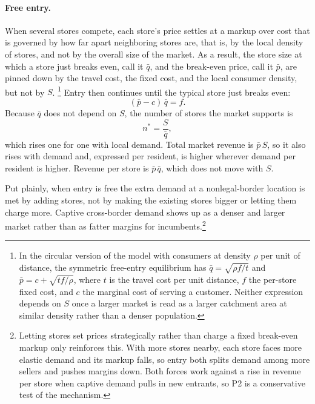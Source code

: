 \documentclass[english,12pt]{article}
\begin{document}
\paragraph{Free entry.} When several stores compete, each store's price settles at a markup over cost that is governed by how far apart neighboring stores are, that is, by the local density of stores, and not by the overall size of the market. As a result, the store size at which a store just breaks even, call it $\bar q$, and the break-even price, call it $\bar p$, are pinned down by the travel cost, the fixed cost, and the local consumer density, but not by $S$.%
\footnote{In the circular version of the model with consumers at density $\rho$ per unit of distance, the symmetric free-entry equilibrium has $\bar q = \sqrt{\rho f / t}$ and $\bar p = c + \sqrt{t f / \rho}$, where $t$ is the travel cost per unit distance, $f$ the per-store fixed cost, and $c$ the marginal cost of serving a customer. Neither expression depends on $S$ once a larger market is read as a larger catchment area at similar density rather than a denser population.}
Entry then continues until the typical store just breaks even:
\begin{equation}
\label{eq:zeroprofit}
(\bar p - c)\,\bar q = f .
\end{equation}
Because $\bar q$ does not depend on $S$, the number of stores the market supports is
\begin{equation}
\label{eq:nstar}
n^\ast = \frac{S}{\bar q},
\end{equation}
which rises one for one with local demand. Total market revenue is $\bar p\, S$, so it also rises with demand and, expressed per resident, is higher wherever demand per resident is higher. Revenue per store is $\bar p\, \bar q$, which does not move with $S$.

Put plainly, when entry is free the extra demand at a nonlegal-border location is met by adding stores, not by making the existing stores bigger or letting them charge more. Captive cross-border demand shows up as a denser and larger market rather than as fatter margins for incumbents.\footnote{Letting stores set prices strategically rather than charge a fixed break-even markup only reinforces this. With more stores nearby, each store faces more elastic demand and its markup falls, so entry both splits demand among more sellers and pushes margins down. Both forces work against a rise in revenue per store when captive demand pulls in new entrants, so P2 is a conservative test of the mechanism.}
\end{document}
